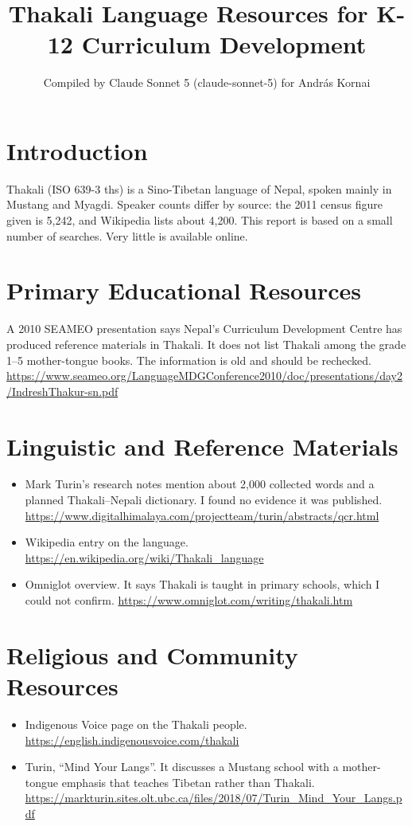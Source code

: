 \documentclass[12pt]{article}
\title{Thakali Language Resources for K-12 Curriculum Development}
\author{Compiled by Claude Sonnet 5 (claude-sonnet-5) for Andr\'as Kornai}
\date{}
\begin{document}
\maketitle

\section{Introduction}
Thakali (ISO 639-3 ths) is a Sino-Tibetan language of Nepal, spoken mainly in Mustang and Myagdi. Speaker counts differ by source: the 2011 census figure given is 5,242, and Wikipedia lists about 4,200. This report is based on a small number of searches. Very little is available online.

\section{Primary Educational Resources}
A 2010 SEAMEO presentation says Nepal's Curriculum Development Centre has produced reference materials in Thakali. It does not list Thakali among the grade 1--5 mother-tongue books. The information is old and should be rechecked. \url{https://www.seameo.org/LanguageMDGConference2010/doc/presentations/day2/IndreshThakur-sn.pdf}

\section{Linguistic and Reference Materials}
\begin{itemize}
\item Mark Turin's research notes mention about 2,000 collected words and a planned Thakali--Nepali dictionary. I found no evidence it was published. \url{https://www.digitalhimalaya.com/projectteam/turin/abstracts/qcr.html}
\item Wikipedia entry on the language. \url{https://en.wikipedia.org/wiki/Thakali_language}
\item Omniglot overview. It says Thakali is taught in primary schools, which I could not confirm. \url{https://www.omniglot.com/writing/thakali.htm}
\end{itemize}

\section{Religious and Community Resources}
\begin{itemize}
\item Indigenous Voice page on the Thakali people. \url{https://english.indigenousvoice.com/thakali}
\item Turin, ``Mind Your Langs''. It discusses a Mustang school with a mother-tongue emphasis that teaches Tibetan rather than Thakali. \url{https://markturin.sites.olt.ubc.ca/files/2018/07/Turin_Mind_Your_Langs.pdf}
\end{itemize}
\end{document}
